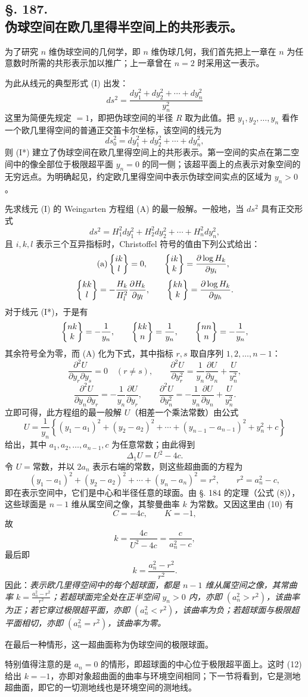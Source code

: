 \subsection*{§. 187.\\ 伪球空间在欧几里得半空间上的共形表示。}

为了研究 $n$ 维伪球空间的几何学，即 $n$ 维伪球几何，我们首先把上一章在 $n$ 为任意数时所需的共形表示加以推广；上一章曾在 $n=2$ 时采用这一表示。

为此从线元的典型形式 (I) 出发：
\[
\tag{I*}
 ds^2=\frac{dy_1^2+dy_2^2+\cdots+dy_n^2}{y_n^2}
\]
这里为简便先规定 $=1$，即把伪球空间的半径 $R$ 取为此值。把 $y_1,y_2,\ldots,y_n$ 看作一个欧几里得空间的普通正交笛卡尔坐标，该空间的线元为
\[
 ds_0^2=dy_1^2+dy_2^2+\cdots+dy_n^2,
\]
则 (I*) 建立了伪球空间在欧几里得空间上的共形表示。第一空间的实点在第二空间中的像全部位于极限超平面 $y_n=0$ 的同一侧；该超平面上的点表示对象空间的无穷远点。为明确起见，约定欧几里得空间中表示伪球空间实点的区域为 $y_n>0$。

先求线元 (I) 的 Weingarten 方程组 (A) 的最一般解。一般地，当 $ds^2$ 具有正交形式
\[
 ds^2=H_1^2dy_1^2+H_2^2dy_2^2+\cdots+H_n^2dy_n^2,
\]
且 $i,k,l$ 表示三个互异指标时，Christoffel 符号的值由下列公式给出：
\[
\tag{a}
 \left\{\begin{matrix}ik\\l\end{matrix}\right\}=0,
 \qquad
 \left\{\begin{matrix}ik\\k\end{matrix}\right\}=\frac{\partial\log H_k}{\partial y_i},
\]
\[
 \left\{\begin{matrix}kk\\l\end{matrix}\right\}=-\frac{H_k}{H_l^2}\frac{\partial H_k}{\partial y_l},
 \qquad
 \left\{\begin{matrix}kh\\k\end{matrix}\right\}=\frac{\partial\log H_k}{\partial y_h}.
\]
对于线元 (I*)，于是有
\[
 \left\{\begin{matrix}nk\\k\end{matrix}\right\}=-\frac1{y_n},
 \qquad
 \left\{\begin{matrix}kk\\n\end{matrix}\right\}=\frac1{y_n},
 \qquad
 \left\{\begin{matrix}nn\\n\end{matrix}\right\}=-\frac1{y_n},
\]
其余符号全为零，而 (A) 化为下式，其中指标 $r,s$ 取自序列 $1,2,\ldots,n-1$：
\[
 \frac{\partial^2U}{\partial y_r\partial y_s}=0\quad(r\ne s),
 \qquad
 \frac{\partial^2U}{\partial y_r^2}=\frac1{y_n}\frac{\partial U}{\partial y_n}+\frac{U}{y_n^2},
\]
\[
 \frac{\partial^2U}{\partial y_n\partial y_r}= -\frac1{y_n}\frac{\partial U}{\partial y_r},
 \qquad
 \frac{\partial^2U}{\partial y_n^2}= -\frac1{y_n}\frac{\partial U}{\partial y_n}+\frac{U}{y_n^2}.
\]
立即可得，此方程组的最一般解 $U$（相差一个乘法常数）由公式
\[
\tag{9}
 U=\frac1{y_n}\left\{(y_1-a_1)^2+(y_2-a_2)^2+\cdots+(y_{n-1}-a_{n-1})^2+y_n^2+c\right\}
\]
给出，其中 $a_1,a_2,\ldots,a_{n-1},c$ 为任意常数；由此得到
\[
\tag{10}
 \Delta_1U=U^2-4c.
\]
令 $U=\text{常数}$，并以 $2a_n$ 表示右端的常数，则这些超曲面的方程为
\[
\tag{11}
 (y_1-a_1)^2+(y_2-a_2)^2+\cdots+(y_n-a_n)^2=r^2,
 \qquad r^2=a_n^2-c,
\]
即在表示空间中，它们是中心和半径任意的球面。由 §. 184 的定理（公式 (8)），这些球面是 $n-1$ 维从属空间之像，其黎曼曲率 $k$ 为常数。又因这里由 (10) 有
\[
 C=-4c,
 \qquad K=-1,
\]
故
\[
 k=\frac{4c}{U^2-4c}=\frac{c}{a_n^2-c},
\]
最后即
\[
\tag{12}
 k=\frac{a_n^2-r^2}{r^2}.
\]
因此：\emph{表示欧几里得空间中的每个超球面，都是 $n-1$ 维从属空间之像，其常曲率 $k=\frac{a_n^2-r^2}{r^2}$；若超球面完全处在正半空间 $y_n>0$ 内，亦即 $(a_n^2>r^2)$，该曲率为正；若它穿过极限超平面，亦即 $(a_n^2<r^2)$，该曲率为负；若超球面与极限超平面相切，亦即 $(a_n^2=r^2)$，该曲率为零。}

在最后一种情形，这一超曲面称为伪球空间的极限球面。

特别值得注意的是 $a_n=0$ 的情形，即超球面的中心位于极限超平面上。这时 (12) 给出 $k=-1$，亦即对象超曲面的曲率与环境空间相同；下一节将看到，它是测地超曲面，即它的一切测地线也是环境空间的测地线。
